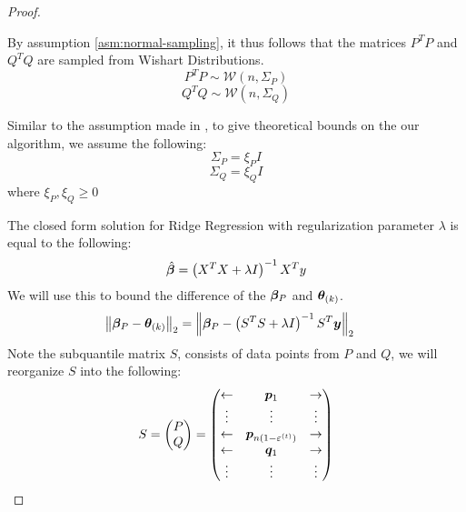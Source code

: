 \documentclass{article} %
\newcommand{\norm}[1]{\left\lVert#1\right\rVert}
\begin{document}
\begin{appendices}
\begin{proof}
	\begin{assumption}\label{asm:wishart}
		By assumption \ref{asm:normal-sampling}, it thus follows that the matrices $P^T P$ and $Q^T Q$ are sampled from Wishart Distributions.
		\begin{equation}
			P^T P \sim \mathcal{W}\left(n,\Sigma_P\right)
		\end{equation}
		\begin{equation}
			Q^T Q \sim \mathcal{W}\left(n, \Sigma_Q\right)
		\end{equation}
	\end{assumption}

	\begin{assumption}\label{asm:identity-covariance}
		Similar to the assumption made in \cite{bhatia2017}, to give theoretical bounds on the our algorithm, we assume the following:
		\begin{equation}
			\Sigma_P = \xi_P I
		\end{equation}
		\begin{equation} 
			\Sigma_Q = \xi_Q I
		\end{equation}
		where $\xi_P,\xi_Q \geq 0$ 
	\end{assumption}
	The closed form solution for Ridge Regression with regularization parameter $\lambda$ is equal to the following:
	\begin{equation}
		\hat{{\bm{\beta}}} = \left(X^T X+ \lambda I\right)^{-1}X^T y
	\end{equation}
	We will use this to bound the difference of the ${\bm{\beta}}_P$ and ${\bm{\theta}}_{(k)}$.
	\begin{align*}
		\norm{\vbeta_P - \vtheta_{(k)}}_2 &= \norm{\vbeta_P - \left(S^T S + \lambda I\right)^{-1}S^T \vy}_2 &&\\
	\end{align*}
	Note the subquantile matrix $S$, consists of data points from $P$ and $Q$, we will reorganize $S$ into the following:
	\begin{equation*}
		S = \begin{pmatrix}P \\ Q \end{pmatrix} = 
		\begin{pmatrix}
			\leftarrow & {\bm{p}}_1 & \rightarrow \\
			\vdots & \vdots & \vdots \\
			\leftarrow & {\bm{p}}_{n(1-\varepsilon^{(t)})} & \rightarrow\\
			\leftarrow & {\bm{q}}_1 & \rightarrow \\
			\vdots & \vdots & \vdots \\

\end{pmatrix}
\end{equation*}
\end{proof}
\end{appendices}
\end{document}
